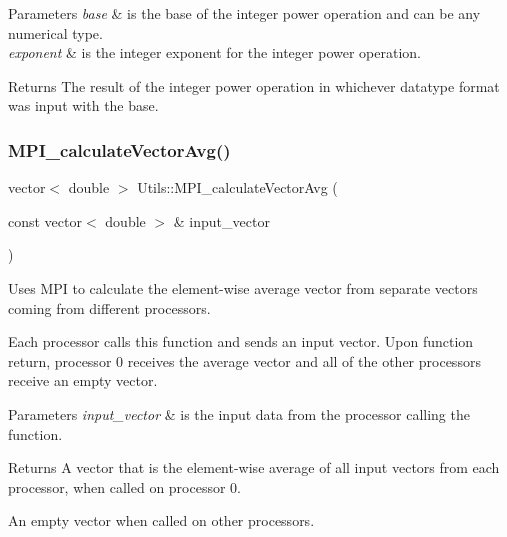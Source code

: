 \begin{DoxyParams}{Parameters}
{\em base} & is the base of the integer power operation and can be any numerical type. \\
\hline
{\em exponent} & is the integer exponent for the integer power operation. \\
\hline
\end{DoxyParams}
\begin{DoxyReturn}{Returns}
The result of the integer power operation in whichever datatype format was input with the base. 
\end{DoxyReturn}
\mbox{\label{namespace_utils_ac9a27519719bf1493bb2b4f56b0019c9}} 
\subsubsection{\texorpdfstring{M\+P\+I\+\_\+calculate\+Vector\+Avg()}{MPI\_calculateVectorAvg()}}
{\footnotesize\ttfamily vector$<$ double $>$ Utils\+::\+M\+P\+I\+\_\+calculate\+Vector\+Avg (\begin{DoxyParamCaption}\item[{const vector$<$ double $>$ \&}]{input\+\_\+vector }\end{DoxyParamCaption})}



Uses M\+PI to calculate the element-\/wise average vector from separate vectors coming from different processors. 

Each processor calls this function and sends an input vector. Upon function return, processor 0 receives the average vector and all of the other processors receive an empty vector. 
\begin{DoxyParams}{Parameters}
{\em input\+\_\+vector} & is the input data from the processor calling the function. \\
\hline
\end{DoxyParams}
\begin{DoxyReturn}{Returns}
A vector that is the element-\/wise average of all input vectors from each processor, when called on processor 0. 

An empty vector when called on other processors. 
\end{DoxyReturn}
\mbox{\label{namespace_utils_ae42867cb7be2aca3ff23e27a94c4f68b}} 
